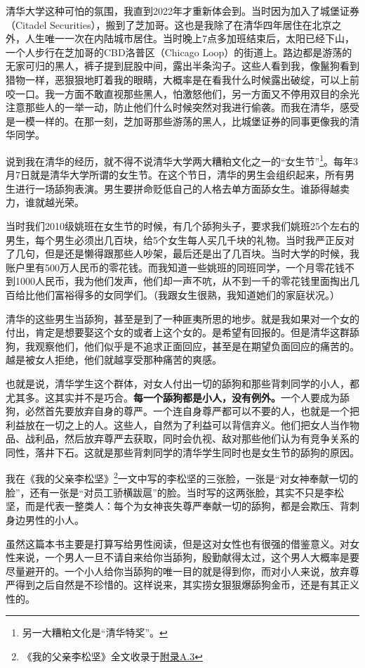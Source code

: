 清华大学这种可怕的氛围，我直到2022年才重新体会到。当时因为加入了城堡证券（Citadel Securities），搬到了芝加哥。这也是我除了在清华四年居住在北京之外，人生唯一一次在内陆城市居住。当时晚上7点多加班结束后，太阳已经下山，一个人步行在芝加哥的CBD洛普区（Chicago Loop）的街道上。路边都是游荡的无家可归的黑人，裤子提到屁股中间，露出半条沟子。这些人看到我，像鬣狗看到猎物一样，恶狠狠地盯着我的眼睛，大概率是在看我什么时候露出破绽，可以上前咬一口。我一方面不敢直视那些黑人，怕激怒他们，另一方面又不停用双目的余光注意那些人的一举一动，防止他们什么时候突然对我进行偷袭。而我在清华，感受是一模一样的。在那一刻，芝加哥那些游荡的黑人，比城堡证券的同事更像我的清华同学。

说到我在清华的经历，就不得不说清华大学两大糟粕文化之一的``女生节''\footnote{另一大糟粕文化是``清华特奖''。}。每年3月7日就是清华大学所谓的女生节。在这个节日，清华的男生会组织起来，所有男生进行一场舔狗表演。男生要拼命贬低自己的人格去单方面舔女生。谁舔得越卖力，谁就越光荣。

当时我们2010级姚班在女生节的时候，有几个舔狗头子，要求我们姚班25个左右的男生，每个男生必须出几百块，给5个女生每人买几千块的礼物。当时我严正反对了几句，但是还是懒得跟那些人吵架，最后还是出了几百块。当时大学的时候，我账户里有500万人民币的零花钱。而我知道一些姚班的同班同学，一个月零花钱不到1000人民币，我为他们发声，他们却一声不吭，从不到一千的零花钱里面掏出几百给比他们富裕得多的女同学们。（我跟女生很熟，我知道她们的家庭状况。）

清华的这些男生当舔狗，甚至是到了一种匪夷所思的地步。就是我如果对一个女的付出，肯定是想要娶这个女的或者上这个女的。是希望有回报的。但是清华这群舔狗，我观察他们，他们似乎是不追求正面回应，甚至是在期望负面回应的痛苦的。越是被女人拒绝，他们就越享受那种痛苦的爽感。

也就是说，清华学生这个群体，对女人付出一切的舔狗和那些背刺同学的小人，都尤其多。这其实并不是巧合。\textbf{每一个舔狗都是小人，没有例外。}一个人要成为舔狗，必然首先要放弃自身的尊严。一个连自身尊严都可以不要的人，也就是一个把利益放在一切之上的人。这些人，自然为了利益可以背信弃义。他们把女人当作物品、战利品，然后放弃尊严去获取，同时会仇视、敌对那些他们认为有竞争关系的同性，落井下石。这就是那些背刺同学的清华学生同时也是女生节的舔狗的原因。

我在《我的父亲李松坚》\footnote{《我的父亲李松坚》全文收录于\hyperref[3faces]{附录A.3}}一文中写的李松坚的三张脸，一张是``对女神奉献一切的脸''，还有一张是``对员工骄横跋扈''的脸。当时写的这两张脸，其实不只是李松坚，而是代表一整类人：每个为女神丧失尊严奉献一切的舔狗，都是会欺压、背刺身边男性的小人。

虽然这篇本书主要是打算写给男性阅读，但是这对女性也有很强的借鉴意义。对女性来说，一个男人一旦不请自来给你当舔狗，殷勤献得太过，这个男人大概率是要尽量避开的。一个小人给你当舔狗的唯一目的就是得到你，而对小人来说，放弃尊严得到之后自然是不珍惜的。这样说来，其实捞女狠狠爆舔狗金币，还是有其正义性的。
